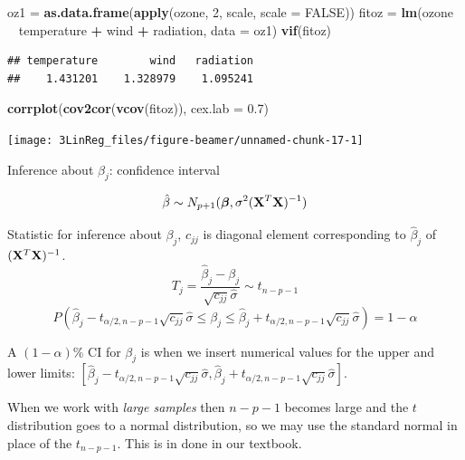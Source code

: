 \documentclass[10pt,ignorenonframetext,]{beamer}
\newenvironment{Shaded}{\begin{snugshade}}{\end{snugshade}}
\newcommand{\KeywordTok}[1]{\textcolor[rgb]{0.13,0.29,0.53}{\textbf{#1}}}
\newcommand{\DataTypeTok}[1]{\textcolor[rgb]{0.13,0.29,0.53}{#1}}
\newcommand{\DecValTok}[1]{\textcolor[rgb]{0.00,0.00,0.81}{#1}}
\newcommand{\FloatTok}[1]{\textcolor[rgb]{0.00,0.00,0.81}{#1}}
\newcommand{\StringTok}[1]{\textcolor[rgb]{0.31,0.60,0.02}{#1}}
\newcommand{\OtherTok}[1]{\textcolor[rgb]{0.56,0.35,0.01}{#1}}
\newcommand{\OperatorTok}[1]{\textcolor[rgb]{0.81,0.36,0.00}{\textbf{#1}}}
\newcommand{\NormalTok}[1]{#1}
\begin{document}
\begin{frame}[fragile]

\small

\begin{Shaded}
\begin{Highlighting}[]
\NormalTok{oz1 =}\StringTok{ }\KeywordTok{as.data.frame}\NormalTok{(}\KeywordTok{apply}\NormalTok{(ozone, }\DecValTok{2}\NormalTok{, scale, }\DataTypeTok{scale =} \OtherTok{FALSE}\NormalTok{))}
\NormalTok{fitoz =}\StringTok{ }\KeywordTok{lm}\NormalTok{(ozone }\OperatorTok{~}\StringTok{ }\NormalTok{temperature }\OperatorTok{+}\StringTok{ }\NormalTok{wind }\OperatorTok{+}\StringTok{ }\NormalTok{radiation, }\DataTypeTok{data =}\NormalTok{ oz1)}
\KeywordTok{vif}\NormalTok{(fitoz)}
\end{Highlighting}
\end{Shaded}

\begin{verbatim}
## temperature        wind   radiation 
##    1.431201    1.328979    1.095241
\end{verbatim}

\begin{Shaded}
\begin{Highlighting}[]
\KeywordTok{corrplot}\NormalTok{(}\KeywordTok{cov2cor}\NormalTok{(}\KeywordTok{vcov}\NormalTok{(fitoz)), }\DataTypeTok{cex.lab =} \FloatTok{0.7}\NormalTok{)}
\end{Highlighting}
\end{Shaded}

\texttt{[image: 3LinReg\_files/figure-beamer/unnamed-chunk-17-1]}
\normalsize

\end{frame}

\begin{frame}

\begin{block}{Inference about \(\beta_j\): confidence interval}

\[\hat{\beta}\sim N_{p+1}(\boldsymbol{\beta},\sigma^2({\bf X}^T{\bf X})^{-1})\]

Statistic for inference about \(\beta_j\), \(c_{jj}\) is diagonal
element corresponding to \(\hat{\beta}_j\) of
\(({\bf X}^T{\bf X})^{-1}\).
\[ T_j=\frac{\hat{\beta}_j-\beta_j}{\sqrt{c_{jj}}\hat{\sigma}}\sim t_{n-p-1}\]
\[ P(\hat{\beta}_j-t_{\alpha/2,n-p-1}\sqrt{c_{jj}}\hat{\sigma}
\le \beta_j \le \hat{\beta}_j+t_{\alpha/2,n-p-1}\sqrt{c_{jj}}\hat{\sigma})=1-\alpha\]

A \((1-\alpha)\)\% CI for \(\beta_j\) is when we insert numerical values
for the upper and lower limits:
\([\hat{\beta}_j-t_{\alpha/2,n-p-1}\sqrt{c_{jj}}\hat{\sigma},\hat{\beta}_j+t_{\alpha/2,n-p-1}\sqrt{c_{jj}}\hat{\sigma}]\).

When we work with \emph{large samples} then \(n-p-1\) becomes large and
the \(t\) distribution goes to a normal distribution, so we may use the
standard normal in place of the \(t_{n-p-1}\). This is in done in our
textbook.

\end{block}

\end{frame}
\end{document}
